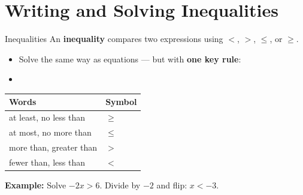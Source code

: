 \section{Writing and Solving Inequalities}

\begin{quickReview}{Inequalities}
An \textbf{inequality} compares two expressions using $<$, $>$, $\leq$, or $\geq$.

\begin{itemize}[leftmargin=*]
    \item Solve the same way as equations — but with \textbf{one key rule}:
    \item {}
\end{itemize}

\medskip
\begin{center}
\begin{tabular}{l l}
    \textbf{Words} & \textbf{Symbol} \\
    \hline
    at least, no less than & $\geq$ \\
    at most, no more than & $\leq$ \\
    more than, greater than & $>$ \\
    fewer than, less than & $<$ \\
\end{tabular}
\end{center}

\textbf{Example:} Solve $-2x > 6$. Divide by $-2$ and flip: $x < -3$.
\end{quickReview}

